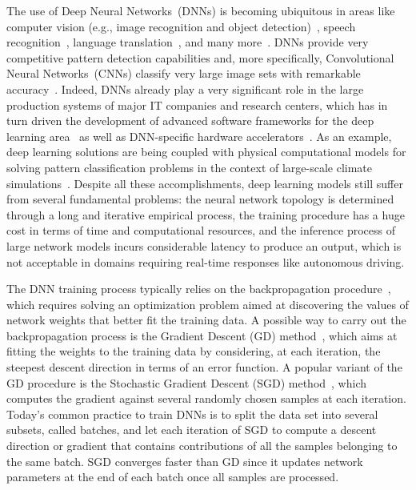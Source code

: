The use of Deep Neural Networks~(DNNs) is becoming ubiquitous in areas like
computer vision (e.g., image recognition and object detection)~\cite{alexnet,
Inception}, speech recognition~\cite{Acoustic}, language
translation~\cite{Language}, and many more~\cite{Ciregan2012}. DNNs provide
very competitive pattern detection capabilities and, more specifically,
Convolutional Neural Networks~(CNNs) classify very large image sets with
remarkable accuracy~\cite{Krizhevsky2012}. Indeed, DNNs already play a very
significant role in the large production systems of major IT companies and
research centers, which has in turn driven the development of advanced
software frameworks for the deep learning area~\cite{tensorflow} as well as
DNN-specific hardware accelerators~\cite{Merolla668,Jouppi2017}. As an
example, deep learning solutions are being coupled with physical
computational models for solving pattern classification problems in the
context of large-scale climate simulations~\cite{Kurth2017}. Despite all
these accomplishments, deep learning models still suffer from several
fundamental problems: the neural network topology is determined through a
long and iterative empirical process, the training procedure has a huge cost
in terms of time and computational resources, and the inference process of
large network models incurs considerable latency to produce an output, which
is not acceptable in domains requiring real-time responses like autonomous
driving.

The DNN training process typically relies on the backpropagation
procedure~\cite{Werbos74}, which requires solving an optimization problem
aimed at discovering the values of network weights that better fit the
training data. A possible way to carry out the backpropagation process is the
Gradient Descent (GD) method~\cite{Press88}, which aims at fitting the
weights to the training data by considering, at each iteration, the steepest
descent direction in terms of an error function. A popular variant of the GD
procedure is the Stochastic Gradient Descent (SGD)
method~\cite{KieferWolfowitz1952}, which computes the gradient against
several randomly chosen samples at each iteration. Today's common practice to
train DNNs is to split the data set into several subsets, called batches, and
let each iteration of SGD to compute a descent direction or gradient that
contains contributions of all the samples belonging to the same batch. SGD
converges faster than GD since it updates network parameters at the end of
each batch once all samples are processed.

